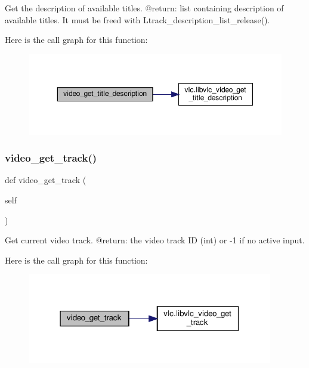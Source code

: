 \begin{DoxyVerb}Get the description of available titles.
@return: list containing description of available titles. It must be freed with L{track_description_list_release}().
\end{DoxyVerb}
 Here is the call graph for this function\+:
\nopagebreak
\begin{figure}[H]
\begin{center}
\leavevmode
\includegraphics[width=350pt]{classvlc_1_1_media_player_a2e9b941fc96e22aa8f7c1a0e48c1e6d1_cgraph}
\end{center}
\end{figure}
\mbox{\label{classvlc_1_1_media_player_a62cfcb86df91b965626e78487c6f7474}} 
\subsubsection{\texorpdfstring{video\+\_\+get\+\_\+track()}{video\_get\_track()}}
{\footnotesize\ttfamily def video\+\_\+get\+\_\+track (\begin{DoxyParamCaption}\item[{}]{self }\end{DoxyParamCaption})}

\begin{DoxyVerb}Get current video track.
@return: the video track ID (int) or -1 if no active input.
\end{DoxyVerb}
 Here is the call graph for this function\+:
\nopagebreak
\begin{figure}[H]
\begin{center}
\leavevmode
\includegraphics[width=304pt]{classvlc_1_1_media_player_a62cfcb86df91b965626e78487c6f7474_cgraph}
\end{center}
\end{figure}
\mbox{\label{classvlc_1_1_media_player_a2fbaacd793c681e340c5b62022e60f0b}} 
